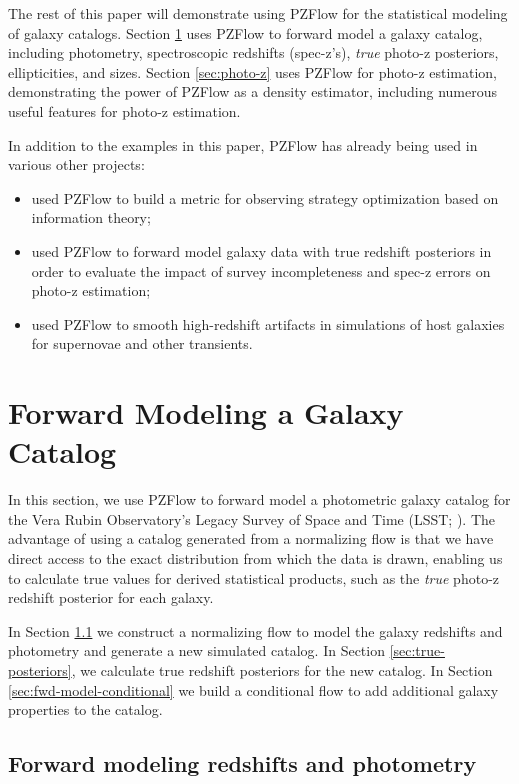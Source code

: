 \documentclass[twocolumn,twocolappendix,linenumbers]{aastex631}
\begin{document}
The rest of this paper will demonstrate using PZFlow for the statistical modeling of galaxy catalogs.
Section \ref{sec:galaxy-catalog} uses PZFlow to forward model a galaxy catalog, including photometry, spectroscopic redshifts (spec-z's), \emph{true} photo-z posteriors, ellipticities, and sizes.
Section \ref{sec:photo-z} uses PZFlow for photo-z estimation, demonstrating the power of PZFlow as a density estimator, including numerous useful features for photo-z estimation.

In addition to the examples in this paper, PZFlow has already being used in various other projects:
\begin{itemize}
    \item \citet{malz2021} used PZFlow to build a metric for observing strategy optimization based on information theory;
    \item \citet{stylianou2022} used PZFlow to forward model galaxy data with true redshift posteriors in order to evaluate the impact of survey incompleteness and spec-z errors on photo-z estimation;
    \item \citet{lokken2022} used PZFlow to smooth high-redshift artifacts in simulations of host galaxies for supernovae and other transients.
\end{itemize}


\section{Forward Modeling a Galaxy Catalog}
\label{sec:galaxy-catalog}

In this section, we use PZFlow to forward model a photometric galaxy catalog for the Vera Rubin Observatory's Legacy Survey of Space and Time (LSST; \citealt{ivezic2019}).
The advantage of using a catalog generated from a normalizing flow is that we have direct access to the exact distribution from which the data is drawn, enabling us to calculate true values for derived statistical products, such as the \emph{true} photo-z redshift posterior for each galaxy.

In Section \ref{sec:fwd-model} we construct a normalizing flow to model the galaxy redshifts and photometry and generate a new simulated catalog.
In Section \ref{sec:true-posteriors}, we calculate true redshift posteriors for the new catalog.
In Section \ref{sec:fwd-model-conditional} we build a conditional flow to add additional galaxy properties to the catalog.

\subsection{Forward modeling redshifts and photometry}
\label{sec:fwd-model}
\end{document}
